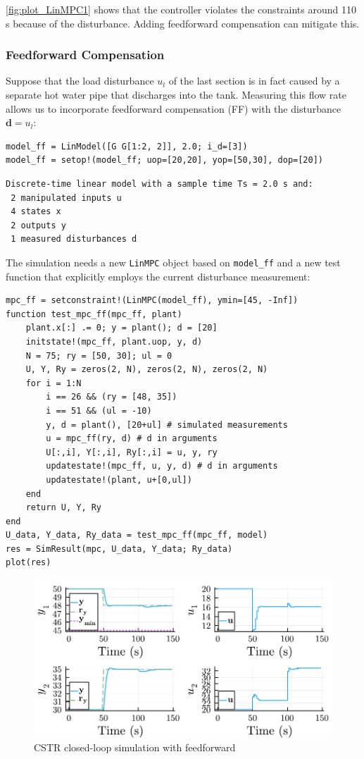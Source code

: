 \cref{fig:plot_LinMPC1} shows that the controller violates the constraints around 110 s because of the disturbance. Adding feedforward compensation can mitigate this.

\subsubsection{Feedforward Compensation}

Suppose that the load disturbance $u_l$ of the last section is in fact caused by a separate hot water pipe that discharges into the tank. Measuring this flow rate allows us to incorporate feedforward compensation (FF) with the disturbance $\mathbf{d}=u_l$:

\begin{verbatim}
model_ff = LinModel([G G[1:2, 2]], 2.0; i_d=[3])
model_ff = setop!(model_ff; uop=[20,20], yop=[50,30], dop=[20])
\end{verbatim}
\spacerepl
\begin{verbatim}
Discrete-time linear model with a sample time Ts = 2.0 s and:
 2 manipulated inputs u
 4 states x
 2 outputs y
 1 measured disturbances d
\end{verbatim}
The simulation needs a new \texttt{LinMPC} object based on \texttt{model\_ff} and a new test function that explicitly employs the current disturbance measurement:
\begin{verbatim}
mpc_ff = setconstraint!(LinMPC(model_ff), ymin=[45, -Inf])
function test_mpc_ff(mpc_ff, plant)
    plant.x[:] .= 0; y = plant(); d = [20]
    initstate!(mpc_ff, plant.uop, y, d)
    N = 75; ry = [50, 30]; ul = 0
    U, Y, Ry = zeros(2, N), zeros(2, N), zeros(2, N)
    for i = 1:N
        i == 26 && (ry = [48, 35])
        i == 51 && (ul = -10)
        y, d = plant(), [20+ul] # simulated measurements
        u = mpc_ff(ry, d) # d in arguments
        U[:,i], Y[:,i], Ry[:,i] = u, y, ry
        updatestate!(mpc_ff, u, y, d) # d in arguments
        updatestate!(plant, u+[0,ul])
    end
    return U, Y, Ry
end
U_data, Y_data, Ry_data = test_mpc_ff(mpc_ff, model)
res = SimResult(mpc, U_data, Y_data; Ry_data)
plot(res)
\end{verbatim}

\begin{figure}[h]
    \centering
    \includegraphics[width=\columnwidth]{fig/plot_LinMPC2.pdf}
    \caption{CSTR closed-loop simulation with feedforward}
    \label{fig:plot_LinMPC2}
\end{figure}

